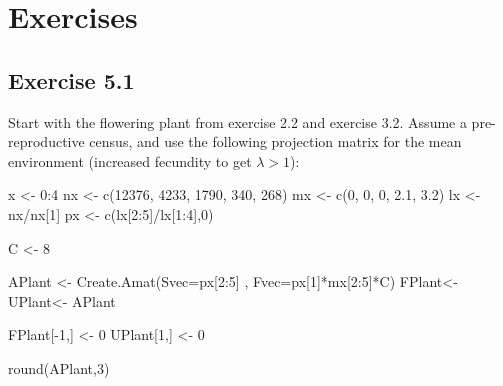 \documentclass[
]{book}
\newenvironment{Shaded}{\begin{snugshade}}{\end{snugshade}}
\newcommand{\AttributeTok}[1]{\textcolor[rgb]{0.77,0.63,0.00}{#1}}
\newcommand{\DecValTok}[1]{\textcolor[rgb]{0.00,0.00,0.81}{#1}}
\newcommand{\FloatTok}[1]{\textcolor[rgb]{0.00,0.00,0.81}{#1}}
\newcommand{\FunctionTok}[1]{\textcolor[rgb]{0.00,0.00,0.00}{#1}}
\newcommand{\NormalTok}[1]{#1}
\newcommand{\OtherTok}[1]{\textcolor[rgb]{0.56,0.35,0.01}{#1}}
\newcommand{\SpecialCharTok}[1]{\textcolor[rgb]{0.00,0.00,0.00}{#1}}
\begin{document}
\hypertarget{exercises-4}{%
\section{Exercises}\label{exercises-4}}

\hypertarget{exercise-5.1}{%
\subsection*{Exercise 5.1}\label{exercise-5.1}}

Start with the flowering plant from exercise 2.2 and exercise 3.2. Assume a pre-reproductive census, and use the following projection matrix for the mean environment (increased fecundity to get \(\lambda>1\)):

\begin{Shaded}
\begin{Highlighting}[]
\NormalTok{x }\OtherTok{\textless{}{-}} \DecValTok{0}\SpecialCharTok{:}\DecValTok{4} 
\NormalTok{nx }\OtherTok{\textless{}{-}} \FunctionTok{c}\NormalTok{(}\DecValTok{12376}\NormalTok{, }\DecValTok{4233}\NormalTok{, }\DecValTok{1790}\NormalTok{, }\DecValTok{340}\NormalTok{, }\DecValTok{268}\NormalTok{)}
\NormalTok{mx }\OtherTok{\textless{}{-}} \FunctionTok{c}\NormalTok{(}\DecValTok{0}\NormalTok{, }\DecValTok{0}\NormalTok{, }\DecValTok{0}\NormalTok{, }\FloatTok{2.1}\NormalTok{, }\FloatTok{3.2}\NormalTok{)}
\NormalTok{lx }\OtherTok{\textless{}{-}}\NormalTok{ nx}\SpecialCharTok{/}\NormalTok{nx[}\DecValTok{1}\NormalTok{]  }
\NormalTok{px }\OtherTok{\textless{}{-}} \FunctionTok{c}\NormalTok{(lx[}\DecValTok{2}\SpecialCharTok{:}\DecValTok{5}\NormalTok{]}\SpecialCharTok{/}\NormalTok{lx[}\DecValTok{1}\SpecialCharTok{:}\DecValTok{4}\NormalTok{],}\DecValTok{0}\NormalTok{) }

\NormalTok{C }\OtherTok{\textless{}{-}} \DecValTok{8} 

\NormalTok{APlant }\OtherTok{\textless{}{-}} \FunctionTok{Create.Amat}\NormalTok{(}\AttributeTok{Svec=}\NormalTok{px[}\DecValTok{2}\SpecialCharTok{:}\DecValTok{5}\NormalTok{] , }\AttributeTok{Fvec=}\NormalTok{px[}\DecValTok{1}\NormalTok{]}\SpecialCharTok{*}\NormalTok{mx[}\DecValTok{2}\SpecialCharTok{:}\DecValTok{5}\NormalTok{]}\SpecialCharTok{*}\NormalTok{C)}
\NormalTok{FPlant}\OtherTok{\textless{}{-}}\NormalTok{ UPlant}\OtherTok{\textless{}{-}}\NormalTok{ APlant}

\NormalTok{FPlant[}\SpecialCharTok{{-}}\DecValTok{1}\NormalTok{,] }\OtherTok{\textless{}{-}} \DecValTok{0} 
\NormalTok{UPlant[}\DecValTok{1}\NormalTok{,] }\OtherTok{\textless{}{-}} \DecValTok{0}  

\FunctionTok{round}\NormalTok{(APlant,}\DecValTok{3}\NormalTok{)}
\end{Highlighting}
\end{Shaded}
\end{document}
